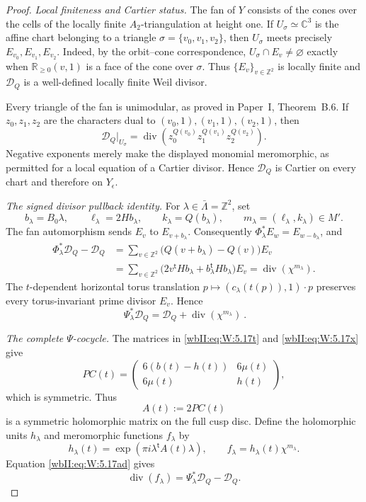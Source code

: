 \begin{proof}
\emph{Local finiteness and Cartier status.}
The fan of \(Y\) consists of the cones over the cells of the locally finite
\(A_2\)-triangulation at height one.  If
\(U_\sigma\simeq\mathbb C^3\) is the affine chart belonging to a triangle
\(\sigma=\{v_0,v_1,v_2\}\), then \(U_\sigma\) meets precisely
\(E_{v_0},E_{v_1},E_{v_2}\).  Indeed, by the orbit--cone
correspondence, \(U_\sigma\cap E_v\ne\varnothing\) exactly when
\(\mathbb R_{\geq0}(v,1)\) is a face of the cone over \(\sigma\).
Thus \(\{E_v\}_{v\in\mathbb Z^2}\) is locally finite and
\(\mathcal D_Q\) is a well-defined locally finite Weil divisor.

Every triangle of the fan is unimodular, as proved in
Paper~I, Theorem~B.6.  If \(z_0,z_1,z_2\) are the
characters dual to
\((v_0,1),(v_1,1),(v_2,1)\), then
\[
 \mathcal D_Q|_{U_\sigma}
 =\operatorname{div}\!
   \left(z_0^{Q(v_0)}z_1^{Q(v_1)}z_2^{Q(v_2)}\right).
\tag{W.69}\label{wbII:eq:W:5.17ab}
\]
Negative exponents merely make the displayed monomial meromorphic, as
permitted for a local equation of a Cartier divisor.  Hence
\(\mathcal D_Q\) is Cartier on every chart and therefore on
\(Y_\epsilon\).

\emph{The signed divisor pullback identity.}
For \(\lambda\in\bar\Lambda=\mathbb Z^2\), set
\[
 b_\lambda=B_0\lambda,
 \qquad
 \ell_\lambda=2Hb_\lambda,
 \qquad
 k_\lambda=Q(b_\lambda),
 \qquad
 m_\lambda=(\ell_\lambda,k_\lambda)\in M'.
\tag{W.70}\label{wbII:eq:W:5.17ac}
\]
The fan automorphism sends \(E_v\) to \(E_{v+b_\lambda}\).
Consequently \(\Phi_\lambda^*E_w=E_{w-b_\lambda}\), and
\begin{align*}
 \Phi_\lambda^*\mathcal D_Q-\mathcal D_Q
 &=\sum_{v\in\mathbb Z^2}
   \bigl(Q(v+b_\lambda)-Q(v)\bigr)E_v\\
 &=\sum_{v\in\mathbb Z^2}
   \bigl(2v^{\mathsf t}Hb_\lambda+
         b_\lambda^{\mathsf t}Hb_\lambda\bigr)E_v
 =\operatorname{div}(\chi^{m_\lambda}).
\end{align*}
The \(t\)-dependent horizontal torus translation
\(p\mapsto(c_\lambda(t(p)),1)\cdot p\) preserves every
torus-invariant prime divisor \(E_v\).  Hence
\[
 \boxed{\ 
 \Psi_\lambda^*\mathcal D_Q
 =\mathcal D_Q+\operatorname{div}(\chi^{m_\lambda})\ }.
\tag{W.71}\label{wbII:eq:W:5.17ad}
\]

\emph{The complete \(\Psi\)-cocycle.}
The matrices in \eqref{wbII:eq:W:5.17t} and \eqref{wbII:eq:W:5.17x} give
\[
 PC(t)=
 \begin{pmatrix}
 6(b(t)-h(t))&6\mu(t)\\
 6\mu(t)&h(t)
 \end{pmatrix},
\tag{W.72}\label{wbII:eq:W:5.17ae}
\]
which is symmetric.  Thus
\[
 A(t):=2PC(t)
\tag{W.73}\label{wbII:eq:W:5.17af}
\]
is a symmetric holomorphic matrix on the full cusp disc.  Define the
holomorphic units \(h_\lambda\) and meromorphic functions \(f_\lambda\) by
\[
 h_\lambda(t)=
 \exp\!\left(\pi i\lambda^{\mathsf t}A(t)\lambda\right),
 \qquad
 f_\lambda=h_\lambda(t)\chi^{m_\lambda}.
\tag{W.74}\label{wbII:eq:W:5.17ag}
\]
Equation \eqref{wbII:eq:W:5.17ad} gives
\[
 \operatorname{div}(f_\lambda)
 =\Psi_\lambda^*\mathcal D_Q-\mathcal D_Q.
\tag{W.75}\label{wbII:eq:W:5.17ah}
\]


\end{proof}
